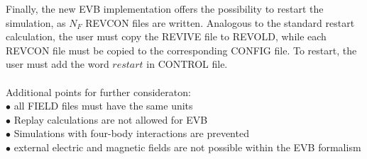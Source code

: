 Finally, the new EVB implementation offers the possibility to restart the simulation, as $N_F$ REVCON files are written. Analogous to the standard restart calculation, the user must copy the REVIVE file to REVOLD, while each REVCON file must be copied to the corresponding CONFIG file. To restart, the user must add the word $restart$ in CONTROL file.\\
\\
Additional points for further consideraton:\\
$\bullet$ all FIELD files must have the same units\\
$\bullet$ Replay calculations are not allowed for EVB\\
$\bullet$ Simulations with four-body interactions are prevented\\
$\bullet$ external electric and magnetic fields are not possible within the EVB formalism\\




